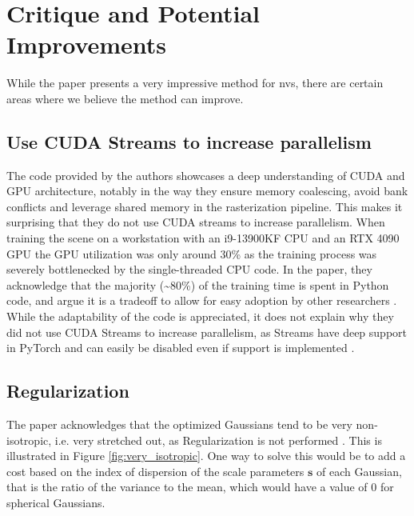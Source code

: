 \section{Critique and Potential Improvements}
While the paper presents a very impressive method for \gls{nvs}, there are certain areas where we believe the method can improve.




\subsection{Use CUDA Streams to increase parallelism}
The code provided by the authors showcases a deep understanding of CUDA and GPU architecture,
notably in the way they ensure memory coalescing, avoid bank conflicts and leverage shared memory in the rasterization pipeline.
This makes it surprising that they do not use CUDA streams to increase parallelism.
When training the scene on a workstation with an i9-13900KF CPU and an RTX 4090 GPU the GPU utilization was only around 30\% as the training process was severely bottlenecked by the single-threaded CPU code.
In the paper, they acknowledge that the majority (\textasciitilde 80\%) of the training time is spent in Python code, and argue it is a tradeoff to allow for easy adoption by other researchers \cite[Sec. 8]{kerbl3DGaussianSplatting2023}.
While the adaptability of the code is appreciated, it does not explain why they did not use CUDA Streams to increase parallelism, as Streams have deep support in PyTorch and can easily be disabled even if support is implemented \cite{pytorchcontributorsCUDASemanticsPyTorch2023}.

\subsection{Regularization}
The paper acknowledges that the optimized Gaussians tend to be very non-isotropic, i.e. very stretched out, as  Regularization is not performed \cite[Sec. 7.4]{kerbl3DGaussianSplatting2023}.
This is illustrated in Figure \ref{fig:very_isotropic}.
One way to solve this would be to add a cost based on the index of dispersion of the scale parameters $\bm{s}$ of each Gaussian, that is the ratio of the variance to the mean, which would have a value of 0 for spherical Gaussians.

